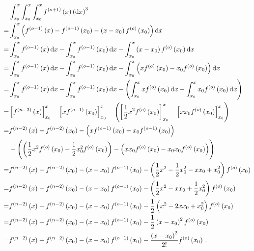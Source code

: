 \begin{align*}
  &\int_{x_0}^x\int_{x_0}^x\int_{x_0}^x{f^{\del{ o+1 }}\del{ x }} \del{ \dif x }^3 \\
  = &\int_{x_0}^x{\del{ f^{\del{ o-1 }}\del{ x } - f^{\del{ o-1 }}\del{ x_0 } - \del{ x - x_0 } f^{\del{ o }}\del{ x_0 } }}\dif x \\
  = &\int_{x_0}^x{f^{\del{ o-1 }}\del{ x }}\dif x - \int_{x_0}^x{f^{\del{ o-1 }}\del{ x_0 }}\dif x - \int_{x_0}^x\del{ x - x_0 }{f^{\del{ o }}\del{ x_0 }}\dif x \\
  = &\int_{x_0}^x{f^{\del{ o-1 }}\del{ x }}\dif x - \int_{x_0}^x{f^{\del{ o-1 }}\del{ x_0 }}\dif x - \int_{x_0}^x\del{x f^{\del{ o }}\del{ x_0 } - x_0 f^{\del{ o }}\del{ x_0 }}\dif x \\
  = &\int_{x_0}^x{f^{\del{ o-1 }}\del{ x }}\dif x - \int_{x_0}^x{f^{\del{ o-1 }}\del{ x_0 }}\dif x - \del{ \int_{x_0}^x{x f^{\del{ o }}\del{ x_0 }}\dif x - \int_{x_0}^x{x_0 f^{\del{ o }}\del{ x_0 }}\dif x } \\
  = &\sbr{ f^{\del{ n-2 }}\del{ x } }_{x_0}^x -\sbr{ x f^{\del{ o-1 }}\del{ x_0 } }_{x_0}^x - \del{ \sbr{ \frac{1}{2}x^2f^{\del{ o }}\del{ x_0 } }_{x_0}^x - \sbr{ xx_0f^{\del{ o }}\del{ x_0 } }_{x_0}^x } \\
  = &f^{\del{ n-2 }}\del{ x }
    - f^{\del{ n-2 }}\del{ x_0 }
    - \del{ x f^{\del{ o-1 }}\del{ x_0 }
    - x_0 f^{\del{ o-1 }}\del{ x_0 } } \\
  &- \del{ \del{ \frac{1}{2} x^2 f^{\del{ o }}\del{ x_0 }
    - \frac{1}{2} x_0^2 f^{\del{ o }}\del{ x_0 } }
    - \del{ x x_0 f^{\del{ o }}\del{ x_0 }
    - x_0 x_0 f^{\del{ o }}\del{ x_0 } } } \\
  = &f^{\del{ n-2 }}\del{ x }
    - f^{\del{ n-2 }}\del{ x_0 }
    - \del{ x - x_0 } f^{\del{ o-1 }}\del{ x_0 } - \del{ \frac{1}{2} x^2 - \frac{1}{2} x_0^2 - x x_0 + x_0^2 } f^{\del{ o }}\del{ x_0 } \\
  = &f^{\del{ n-2 }}\del{ x }
    - f^{\del{ n-2 }}\del{ x_0 }
    - \del{ x - x_0 } f^{\del{ o-1 }}\del{ x_0 } - \del{ \frac{1}{2} x^2 - x x_0 + \frac{1}{2} x_0^2 } f^{\del{ o }}\del{ x_0 } \\
  = &f^{\del{ n-2 }}\del{ x }
    - f^{\del{ n-2 }}\del{ x_0 }
    - \del{ x - x_0 } f^{\del{ o-1 }}\del{ x_0 } - \frac{1}{2} \del{ x^2 - 2 x x_0 + x_0^2 } f^{\del{ o }}\del{ x_0 } \\
  = &f^{\del{ n-2 }}\del{ x }
    - f^{\del{ n-2 }}\del{ x_0 }
    - \del{ x - x_0 } f^{\del{ o-1 }}\del{ x_0 } - \frac{1}{2} \del{ x - x_0 }^2 f^{\del{ o }}\del{ x_0 } \\
  = &f^{\del{ n-2 }}\del{ x }
    - f^{\del{ n-2 }}\del{ x_0 }
    - \del{ x - x_0 } f^{\del{ o-1 }}\del{ x_0 } - \frac{\del{ x - x_0 }^2}{2 !}  f^{\del{ o }}\del{ x_0 } \, .
\end{align*}
